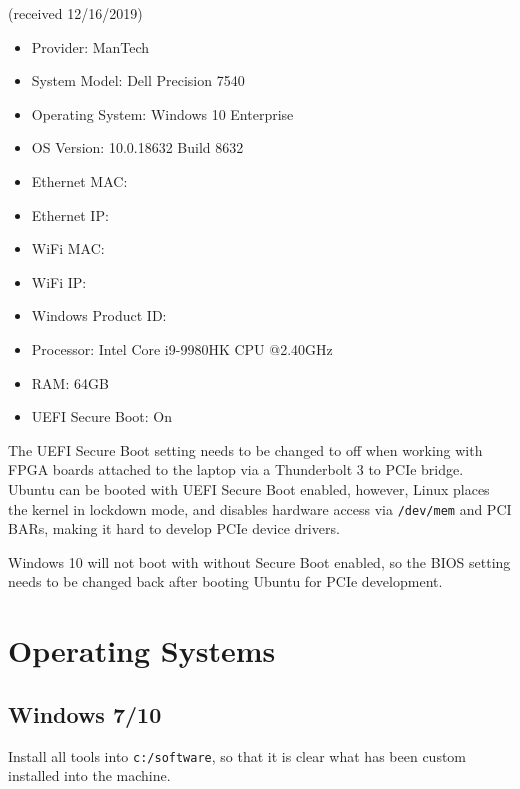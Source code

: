 \documentclass[10pt,twoside]{article}
\begin{document}
\vskip5mm
 (received 12/16/2019)
\begin{itemize}
\item Provider: ManTech
\item System Model: Dell Precision 7540
\item Operating System: Windows 10 Enterprise
\item OS Version: 10.0.18632 Build 8632
\item Ethernet MAC:
\item Ethernet IP:
\item WiFi MAC:
\item WiFi IP:
\item Windows Product ID:
\item Processor: Intel Core i9-9980HK CPU @2.40GHz
\item RAM: 64GB
\item UEFI Secure Boot: On
\end{itemize}

The UEFI Secure Boot setting needs to be changed to off when working with
FPGA boards attached to the laptop via a Thunderbolt 3 to PCIe bridge.
Ubuntu can be booted with UEFI Secure Boot enabled, however, Linux places
the kernel in lockdown mode, and disables hardware access via
\verb+/dev/mem+ and PCI BARs, making it hard to develop PCIe device drivers.

Windows 10 will not boot with without Secure Boot enabled, so the BIOS
setting needs to be changed back after booting Ubuntu for PCIe development.

\clearpage
\section{Operating Systems}

\subsection{Windows 7/10}

Install all tools into \verb+c:/software+, so that it is clear what has
been custom installed into the machine.

\end{document}
